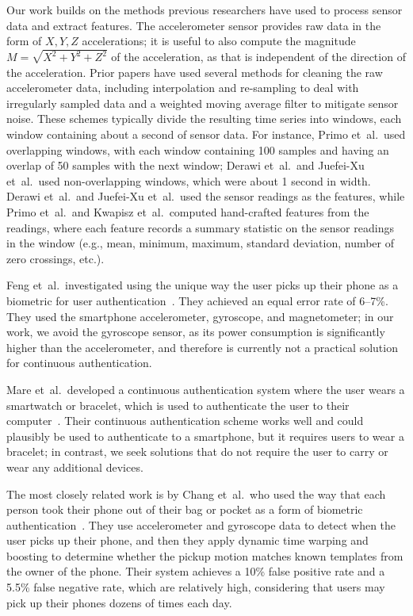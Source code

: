 Our work builds on the methods previous researchers have used to process sensor data and extract features.
The accelerometer sensor provides raw data in the form of $X,Y,Z$ accelerations; it is useful to also compute the magnitude $M=\sqrt{X^2+Y^2+Z^2}$ of the acceleration, as that is independent of the direction of the acceleration.
Prior papers have used several methods for cleaning the raw accelerometer data, including interpolation and re-sampling to deal with irregularly sampled data and a weighted moving average filter to mitigate sensor noise.
These schemes typically divide the resulting time series into windows, each window containing about a second of sensor data.
For instance, Primo et~al.\ used overlapping windows, with each window containing 100 samples and having an overlap of 50 samples with the next window; Derawi et~al.\ and Juefei-Xu et~al.\ used non-overlapping windows, which were about 1 second in width.
Derawi et~al.\ and Juefei-Xu et~al.\ used the sensor readings as the features, while Primo et~al.\ and Kwapisz et~al.\ computed hand-crafted features from the readings, where each feature records a summary statistic on the sensor readings in the window (e.g., mean, minimum, maximum, standard deviation, number of zero crossings, etc.).

Feng et~al.\ investigated using the unique way the user picks up their phone as a biometric for user authentication~\cite{feng:pickup}.
They achieved an equal error rate of 6--7\%.
They used the smartphone accelerometer, gyroscope, and magnetometer; in our work, we avoid the gyroscope sensor, as its power consumption is significantly higher than the accelerometer, and therefore is currently not a practical solution for continuous authentication.

Mare et~al.\ developed a continuous authentication system where the user wears a smartwatch or bracelet, which is used to authenticate the user to their computer~\cite{mare:zebra}.
Their continuous authentication scheme works well and could plausibly be used to authenticate to a smartphone, but it requires users to wear a bracelet; in contrast, we seek solutions that do not require the user to carry or wear any additional devices.

The most closely related work is by Chang et~al.\, who used the way
that each person took their phone out of their bag or pocket as a
form of biometric authentication~\cite{cheng:theft}.
They use accelerometer and gyroscope data to detect when the user picks
up their phone, and then they apply dynamic time warping and boosting to
determine whether the pickup motion matches known templates from the
owner of the phone.
Their system achieves a 10\% false positive rate and a 5.5\% false negative rate, which are relatively high,
considering that users may pick up their phones dozens of times each day.

